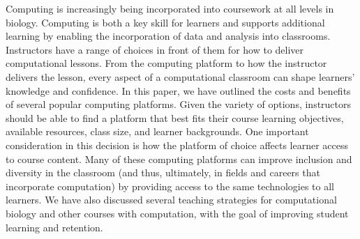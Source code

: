 Computing is increasingly being incorporated into coursework at all levels in biology.
Computing is both a key skill for learners and supports additional learning by enabling the incorporation of data and analysis into classrooms. 
Instructors have a range of choices in front of them for how to deliver computational lessons.
From the computing platform to how the instructor delivers the lesson, every aspect of a computational classroom can shape learners' knowledge and confidence. 
In this paper, we have outlined the costs and benefits of several popular computing platforms.
Given the variety of options, instructors should be able to find a platform that best fits their course learning objectives, available resources, class size, and learner backgrounds.
One important consideration in this decision is how the platform of choice affects learner access to course content.
Many of these computing platforms can improve inclusion and diversity in the classroom (and thus, ultimately, in fields and careers that incorporate computation) by providing access to the same technologies to all learners.
We have also discussed several teaching strategies for computational biology and other courses with computation, with the goal of improving student learning and retention. 





